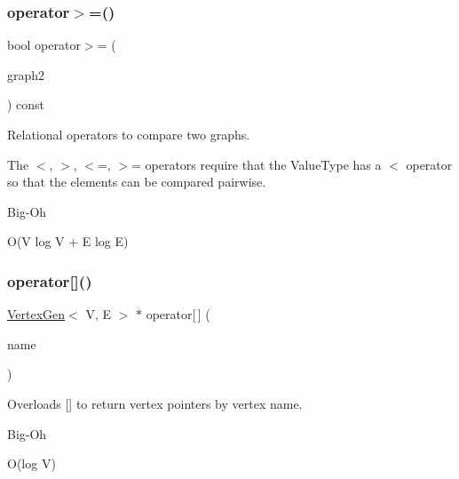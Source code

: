\subsubsection{\texorpdfstring{operator$>$=()}{operator>=()}}
{\footnotesize\ttfamily bool operator$>$= (\begin{DoxyParamCaption}\item[{const \mbox{\hyperlink{classGraph}{Graph}}$<$ \mbox{\hyperlink{classVertexGen}{Vertex\+Gen}}$<$ V, E $>$, Edge\+Gen$<$ V, E $>$ $>$ \&}]{graph2 }\end{DoxyParamCaption}) const\hspace{0.3cm}{\ttfamily [inherited]}}



Relational operators to compare two graphs. 

The $<$, $>$, $<$=, $>$= operators require that the Value\+Type has a $<$ operator so that the elements can be compared pairwise. \begin{DoxyRefDesc}{Big-\/\+Oh}
\item[\mbox{\hyperlink{BigOh__BigOh000098}{Big-\/\+Oh}}]O(V log V + E log E) \end{DoxyRefDesc}
\mbox{\label{classBasicGraphGen_a5e874dbb2f9f2c7f98ec74f00790eb0e}} 
\subsubsection{\texorpdfstring{operator[]()}{operator[]()}\hspace{0.1cm}{\footnotesize\ttfamily [1/2]}}
{\footnotesize\ttfamily \mbox{\hyperlink{classVertexGen}{Vertex\+Gen}}$<$ V, E $>$ $\ast$ operator\mbox{[}$\,$\mbox{]} (\begin{DoxyParamCaption}\item[{const std\+::string \&}]{name }\end{DoxyParamCaption})}



Overloads {\ttfamily \mbox{[}\mbox{]}} to return vertex pointers by vertex name. 

\begin{DoxyRefDesc}{Big-\/\+Oh}
\item[\mbox{\hyperlink{BigOh__BigOh000038}{Big-\/\+Oh}}]O(log V) \end{DoxyRefDesc}
\mbox{\label{classBasicGraphGen_ad91a5b6ebd034841cf4f4c410fb7ed1b}} 
